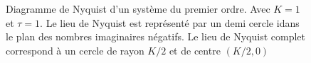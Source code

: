 \begin{figure}[!h]
\begin{center}
\end{center}
\caption{Diagramme de Nyquist d'un système du premier ordre. 
    Avec $K=1$ et $\tau=1$. Le lieu de Nyquist 
    est représenté par un demi cercle idans le plan des nombres 
    imaginaires négatifs. Le lieu de Nyquist complet correspond à un cercle de rayon $K/2$ et de centre $(K/2,0)$ 
    \label{fig-nyquist_1er}}
\end{figure}


\newpage
